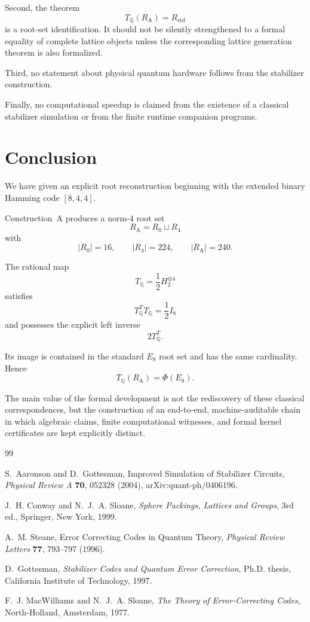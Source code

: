 \documentclass[11pt,a4paper]{article}
\theoremstyle{definition}
\theoremstyle{remark}
\newcommand{\RA}{R_{\mathrm A}}
\newcommand{\Rstd}{R_{\mathrm{std}}}
\newcommand{\TQ}{T_{\mathbb Q}}
\begin{document}
	Second, the theorem
	\[
	\TQ(\RA)=\Rstd
	\]
	is a root-set identification.  It should not be silently strengthened to a
	formal equality of complete lattice objects unless the corresponding lattice
	generation theorem is also formalized.
	
	Third, no statement about physical quantum hardware follows from the
	stabilizer construction.
	
	Finally, no computational speedup is claimed from the existence of a
	classical stabilizer simulation or from the finite runtime companion
	programs.
	
	\section{Conclusion}
	
	We have given an explicit root reconstruction beginning with the extended
	binary Hamming code $[8,4,4]$.
	
	Construction~A produces a norm-$4$ root set
	\[
	\RA=R_0\sqcup R_4
	\]
	with
	\[
	|R_0|=16,
	\qquad
	|R_4|=224,
	\qquad
	|\RA|=240.
	\]
	
	The rational map
	\[
	\TQ=\frac12H_2^{\oplus4}
	\]
	satisfies
	\[
	\TQ^T\TQ=\frac12I_8
	\]
	and possesses the explicit left inverse
	\[
	2\TQ^T.
	\]
	
	Its image is contained in the standard $E_8$ root set and has the same
	cardinality.  Hence
	\[
	\boxed{
		\TQ(\RA)=\Phi(E_8).
	}
	\]
	
	The main value of the formal development is not the rediscovery of these
	classical correspondences, but the construction of an end-to-end,
	machine-auditable chain in which algebraic claims, finite computational
	witnesses, and formal kernel certificates are kept explicitly distinct.
	
	\begin{thebibliography}{99}
		
		S.~Aaronson and D.~Gottesman,
		\newblock Improved Simulation of Stabilizer Circuits,
		\newblock \emph{Physical Review A} \textbf{70}, 052328 (2004),
		\newblock arXiv:quant-ph/0406196.
		
		J.~H. Conway and N.~J.~A. Sloane,
		\newblock \emph{Sphere Packings, Lattices and Groups},
		\newblock 3rd ed., Springer, New York, 1999.
		
		A.~M. Steane,
		\newblock Error Correcting Codes in Quantum Theory,
		\newblock \emph{Physical Review Letters} \textbf{77},
		793--797 (1996).
		
		D.~Gottesman,
		\newblock \emph{Stabilizer Codes and Quantum Error Correction},
		\newblock Ph.D. thesis, California Institute of Technology, 1997.
		
		F.~J. MacWilliams and N.~J.~A. Sloane,
		\newblock \emph{The Theory of Error-Correcting Codes},
		\newblock North-Holland, Amsterdam, 1977.
		
	\end{thebibliography}
	
\end{document}
